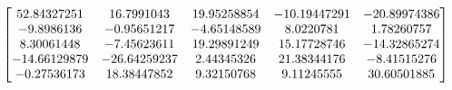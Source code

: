 \begin{answer}
\[
\begin{bmatrix}
52.84327251 & 16.7991043  &  19.95258854 & -10.19447291 & -20.89974386 \\
-9.8986136  &  -0.95651217 & -4.65148589 &  8.0220781  &  1.78260757 \\
8.30061448  &-7.45623611 & 19.29891249  & 15.17728746 & -14.32865274 \\
-14.66129879 & -26.64259237 &  2.44345326  &21.38344176  & -8.41515276 \\
-0.27536173 & 18.38447852  & 9.32150768  & 9.11245555 &30.60501885 \\
\end{bmatrix} \\
\]
\end{answer}
